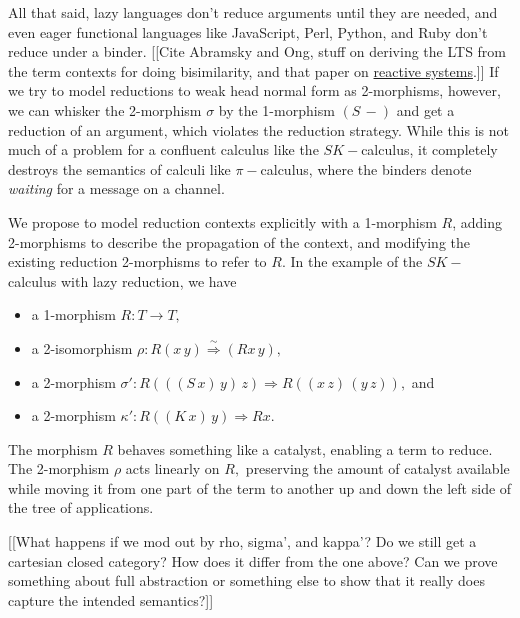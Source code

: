 \documentclass[11pt]{article}
\newcommand{\maps}{\colon}
\begin{document}
All that said, lazy languages don't reduce arguments until they are needed, and even eager functional languages like JavaScript, Perl, Python, and Ruby don't reduce under a binder.  [[Cite Abramsky and Ong, stuff on deriving the LTS from the term contexts for doing bisimilarity, and that paper on  \href{https://users.dimi.uniud.it/~pietro.digianantonio/papers/socl.pdf}{reactive systems}.]]  If we try to model reductions to weak head normal form as 2-morphisms, however, we can whisker the 2-morphism $\sigma$ by the 1-morphism $(S\, -)$ and get a reduction of an argument, which violates the reduction strategy.  While this is not much of a problem for a confluent calculus like the $SK-$calculus, it completely destroys the semantics of calculi like $\pi-$calculus, where the binders denote {\em waiting} for a message on a channel.

We propose to model reduction contexts explicitly with a 1-morphism $R$, adding 2-morphisms to describe the propagation of the context, and modifying the existing reduction 2-morphisms to refer to $R$.  In the example of the $SK-$calculus with lazy reduction, we have
\begin{itemize}
  \item a 1-morphism $R\maps T \to T,$
  \item a 2-isomorphism $\rho\maps R(x\, y) \stackrel{\sim}{\Rightarrow} (Rx\, y),$
  \item a 2-morphism $\sigma'\maps R(((S\, x)\, y)\, z) \Rightarrow R((x\, z)\, (y\, z)),$ and
  \item a 2-morphism $\kappa'\maps R((K\, x)\, y) \Rightarrow Rx.$
\end{itemize}
The morphism $R$ behaves something like a catalyst, enabling a term to reduce.  The 2-morphism $\rho$ acts linearly on $R,$ preserving the amount of catalyst available while moving it from one part of the term to another up and down the left side of the tree of applications.

[[What happens if we mod out by rho, sigma', and kappa'?  Do we still get a cartesian closed category?  How does it differ from the one above?  Can we prove something about full abstraction or something else to show that it really does capture the intended semantics?]]


\begin{thebibliography}{99}
\end{thebibliography} 
\end{document}
